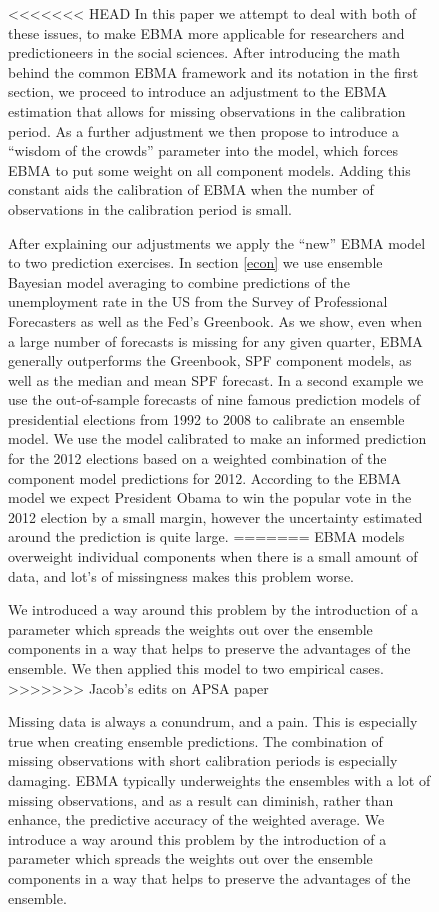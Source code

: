 \documentclass[12pt,fullpage,endnotes]{article}
\begin{document}
\begin{figure}[h]
<<<<<<< HEAD
In this paper we attempt to deal with both of these issues, to make EBMA more applicable for researchers and predictioneers in the social sciences. After introducing the math behind the common EBMA framework and its notation in the first section, we proceed to introduce an adjustment to the EBMA estimation that allows for missing observations in the calibration period. As a further adjustment we then propose to introduce a ``wisdom of the crowds'' parameter into the model, which forces EBMA to put some weight on all component models. Adding this constant aids the calibration of EBMA when the number of observations in the calibration period is small. 

After explaining our adjustments we apply the ``new'' EBMA model to two prediction exercises. In section \ref{econ} we use ensemble Bayesian model averaging to combine predictions of the unemployment rate in the US from the Survey of Professional Forecasters as well as the Fed's Greenbook. As we show, even when a large number of forecasts is missing for any given quarter, EBMA generally outperforms the Greenbook, SPF component models, as well as the median and mean SPF forecast. In a second example we use the out-of-sample forecasts of nine famous prediction models of presidential elections from 1992 to 2008 to calibrate an ensemble model. We use the model calibrated to make an informed prediction for the 2012 elections based on a weighted combination of the component model predictions for 2012. According to the EBMA model we expect President Obama to win the popular vote in the 2012 election by a small margin, however the uncertainty estimated around the prediction is quite large.
=======
EBMA models overweight individual components when there is a small
amount of data, and lot's of missingness makes this problem worse.

We introduced a way around this problem by the introduction of a
parameter which spreads the weights out over the ensemble components
in a way that helps to preserve the advantages of the ensemble.  We
then applied this model to two empirical cases.
>>>>>>> Jacob's edits on APSA paper

Missing data is always a conundrum, and a pain. This is especially true when creating ensemble predictions. The combination of missing observations with short calibration periods is especially damaging. EBMA typically underweights the ensembles with a lot of missing observations, and as a result can diminish, rather than enhance, the predictive accuracy of the weighted average. We introduce a way around this problem by the introduction of a parameter which spreads the weights out over the ensemble components in a way that helps to preserve the advantages of the ensemble.  


\end{figure}
\end{document}
